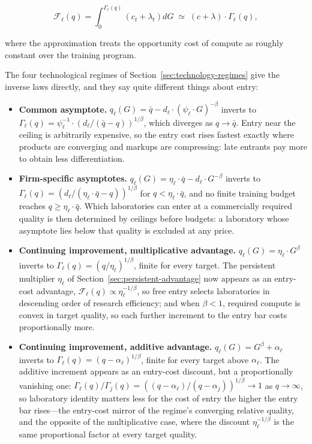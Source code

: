 \documentclass[11pt]{article}
\begin{document}
\begin{equation}\label{eq:entry-cost}\mathcal F_\ell(q)=\int_0^{\Gamma_\ell(q)}\left(c_t+\lambda_t\right)dG\;\simeq\;\left(c+\lambda\right)\cdot\Gamma_\ell(q),\end{equation}

where the approximation treats the opportunity cost of compute as roughly constant over the training program.

The four technological regimes of Section~\ref{sec:technology-regimes} give the inverse laws directly, and they say quite different things about entry:

\begin{itemize}
\item \textbf{Common asymptote.} $q_\ell(G)=\bar q-d_\ell\cdot(\psi_\ell\cdot G)^{-\beta}$ inverts to $\Gamma_\ell(q)=\psi_\ell^{-1}\cdot\left(d_\ell/(\bar q-q)\right)^{1/\beta}$, which diverges as $q\to\bar q$. Entry near the ceiling is arbitrarily expensive, so the entry cost rises fastest exactly where products are converging and markups are compressing: late entrants pay more to obtain less differentiation.
\item \textbf{Firm-specific asymptotes.} $q_\ell(G)=\eta_\ell\cdot\bar q-d_\ell\cdot G^{-\beta}$ inverts to $\Gamma_\ell(q)=\left(d_\ell/(\eta_\ell\cdot\bar q-q)\right)^{1/\beta}$ for $q<\eta_\ell\cdot\bar q$, and no finite training budget reaches $q\geq\eta_\ell\cdot\bar q$. Which laboratories can enter at a commercially required quality is then determined by ceilings before budgets: a laboratory whose asymptote lies below that quality is excluded at any price.
\item \textbf{Continuing improvement, multiplicative advantage.} $q_\ell(G)=\eta_\ell\cdot G^{\beta}$ inverts to $\Gamma_\ell(q)=\left(q/\eta_\ell\right)^{1/\beta}$, finite for every target. The persistent multiplier $\eta_\ell$ of Section~\ref{sec:persistent-advantage} now appears as an entry-cost advantage, $\mathcal F_\ell(q)\propto\eta_\ell^{-1/\beta}$, so free entry selects laboratories in descending order of research efficiency; and when $\beta<1$, required compute is convex in target quality, so each further increment to the entry bar costs proportionally more.
\item \textbf{Continuing improvement, additive advantage.} $q_\ell(G)=G^{\beta}+\alpha_\ell$ inverts to $\Gamma_\ell(q)=\left(q-\alpha_\ell\right)^{1/\beta}$, finite for every target above $\alpha_\ell$. The additive increment appears as an entry-cost discount, but a proportionally vanishing one: $\Gamma_\ell(q)/\Gamma_j(q)=\left((q-\alpha_\ell)/(q-\alpha_j)\right)^{1/\beta}\rightarrow1$ as $q\rightarrow\infty$, so laboratory identity matters less for the cost of entry the higher the entry bar rises---the entry-cost mirror of the regime's converging relative quality, and the opposite of the multiplicative case, where the discount $\eta_\ell^{-1/\beta}$ is the same proportional factor at every target quality.
\end{itemize}
\end{document}
